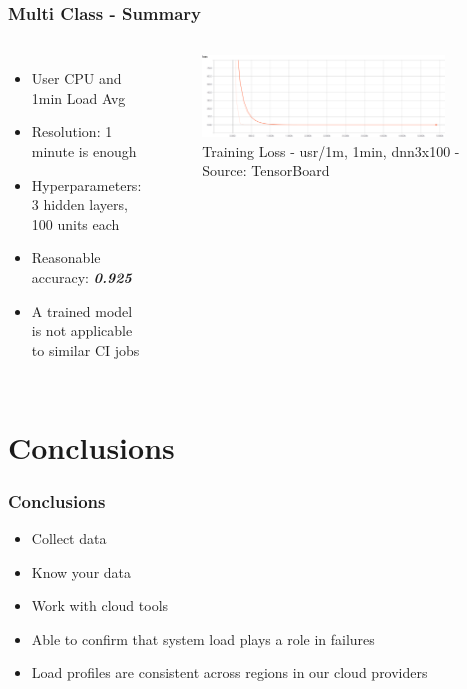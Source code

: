 \documentclass[aspectratio=169,11pt,hyperref={colorlinks=true}]{beamer}
\begin{document}
\begin{frame}
    \frametitle{Multi Class - Summary}
    \begin{columns}
        \begin{itemize}
            \item{User CPU and 1min Load Avg}
            \item{Resolution: 1 minute is enough}
            \item{Hyperparameters: 3 hidden layers, 100 units each}
            \item{Reasonable accuracy: \emph{\textbf{0.925}}}
            \item{A trained model is not applicable to similar CI jobs}
        \end{itemize}
        \begin{figure}
          \begin{center}
            \includegraphics[width=0.9\textwidth,height=0.5\textheight]{graphs/cpu_1m-1min-dnn3x100-node_provider-loss_curve.png}
              \caption{Training Loss - usr/1m, 1min, dnn3x100 - Source: TensorBoard}
          \end{center}
        \end{figure}
      \end{columns}
\end{frame}

\section{Conclusions}
\begin{frame}
  \frametitle{Conclusions}
  \begin{itemize}
      \item{Collect data}
      \item{Know your data}
      \item{Work with cloud tools}
      \item Able to confirm that system load plays a role in failures
      \item Load profiles are consistent across regions in our cloud providers
    \end{itemize}
\end{frame}
\end{document}
